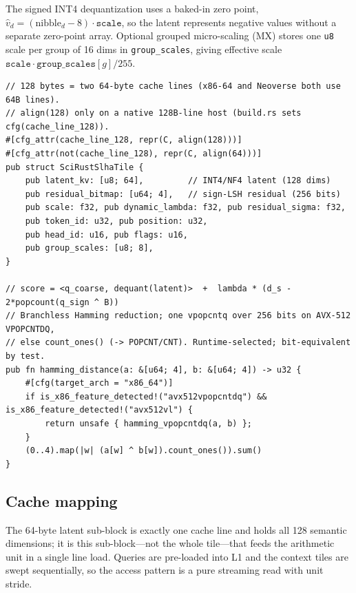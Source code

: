 \documentclass[11pt]{article}
\theoremstyle{plain}
\theoremstyle{definition}
\begin{document}
The signed INT4 dequantization uses a baked-in zero point,
$\hat v_d = (\text{nibble}_d - 8)\cdot \texttt{scale}$, so the latent
represents negative values without a separate zero-point array. Optional
grouped micro-scaling (MX) stores one \texttt{u8} scale per group of 16
dims in \texttt{group\_scales}, giving effective scale
$\texttt{scale}\cdot \texttt{group\_scales}[g]/255$.

\begin{lstlisting}[caption={Core tile and fused score (abridged from
\texttt{scirust/src/attention/slha\_v2.rs}).},captionpos=b]
// 128 bytes = two 64-byte cache lines (x86-64 and Neoverse both use 64B lines).
// align(128) only on a native 128B-line host (build.rs sets cfg(cache_line_128)).
#[cfg_attr(cache_line_128, repr(C, align(128)))]
#[cfg_attr(not(cache_line_128), repr(C, align(64)))]
pub struct SciRustSlhaTile {
    pub latent_kv: [u8; 64],         // INT4/NF4 latent (128 dims)
    pub residual_bitmap: [u64; 4],   // sign-LSH residual (256 bits)
    pub scale: f32, pub dynamic_lambda: f32, pub residual_sigma: f32,
    pub token_id: u32, pub position: u32,
    pub head_id: u16, pub flags: u16,
    pub group_scales: [u8; 8],
}

// score = <q_coarse, dequant(latent)>  +  lambda * (d_s - 2*popcount(q_sign ^ B))
// Branchless Hamming reduction; one vpopcntq over 256 bits on AVX-512 VPOPCNTDQ,
// else count_ones() (-> POPCNT/CNT). Runtime-selected; bit-equivalent by test.
pub fn hamming_distance(a: &[u64; 4], b: &[u64; 4]) -> u32 {
    #[cfg(target_arch = "x86_64")]
    if is_x86_feature_detected!("avx512vpopcntdq") && is_x86_feature_detected!("avx512vl") {
        return unsafe { hamming_vpopcntdq(a, b) };
    }
    (0..4).map(|w| (a[w] ^ b[w]).count_ones()).sum()
}
\end{lstlisting}

\subsection{Cache mapping}
\label{sec:cachemap}
The 64-byte latent sub-block is exactly one cache line and holds all 128
semantic dimensions; it is this sub-block---not the whole tile---that
feeds the arithmetic unit in a single line load. Queries are pre-loaded
into L1 and the context tiles are swept sequentially, so the access
pattern is a pure streaming read with unit stride.
\end{document}
